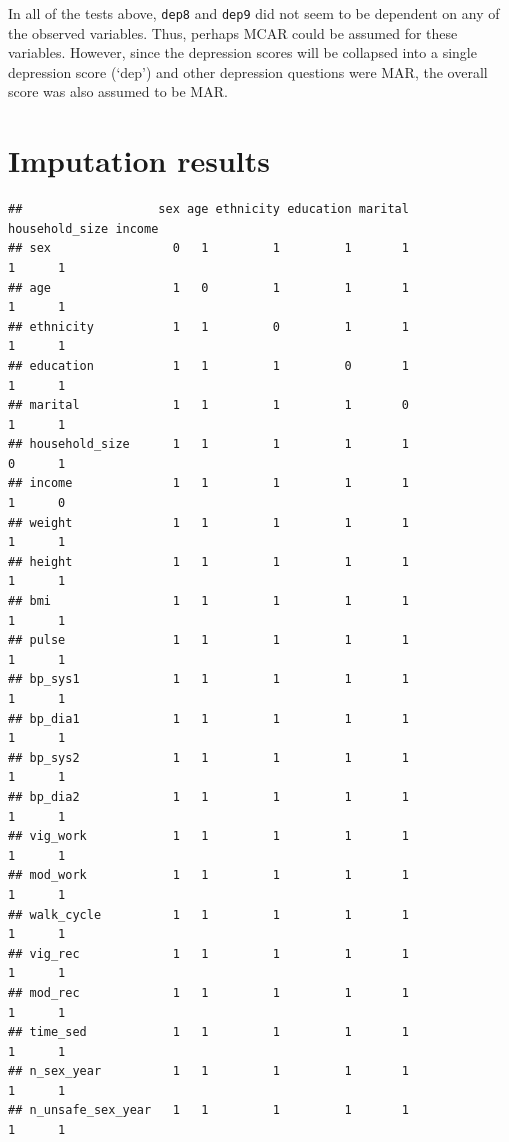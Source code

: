\documentclass[
]{article}
\begin{document}
In all of the tests above, \texttt{dep8} and \texttt{dep9} did not seem to be dependent on any of the observed variables. Thus, perhaps MCAR could be assumed for these variables. However, since the depression scores will be collapsed into a single depression score (`dep') and other depression questions were MAR, the overall score was also assumed to be MAR.

\hypertarget{imputation}{%
\section{Imputation results}\label{imputation}}

\begin{verbatim}
##                   sex age ethnicity education marital household_size income
## sex                 0   1         1         1       1              1      1
## age                 1   0         1         1       1              1      1
## ethnicity           1   1         0         1       1              1      1
## education           1   1         1         0       1              1      1
## marital             1   1         1         1       0              1      1
## household_size      1   1         1         1       1              0      1
## income              1   1         1         1       1              1      0
## weight              1   1         1         1       1              1      1
## height              1   1         1         1       1              1      1
## bmi                 1   1         1         1       1              1      1
## pulse               1   1         1         1       1              1      1
## bp_sys1             1   1         1         1       1              1      1
## bp_dia1             1   1         1         1       1              1      1
## bp_sys2             1   1         1         1       1              1      1
## bp_dia2             1   1         1         1       1              1      1
## vig_work            1   1         1         1       1              1      1
## mod_work            1   1         1         1       1              1      1
## walk_cycle          1   1         1         1       1              1      1
## vig_rec             1   1         1         1       1              1      1
## mod_rec             1   1         1         1       1              1      1
## time_sed            1   1         1         1       1              1      1
## n_sex_year          1   1         1         1       1              1      1
## n_unsafe_sex_year   1   1         1         1       1              1      1

\end{verbatim}
\end{document}
